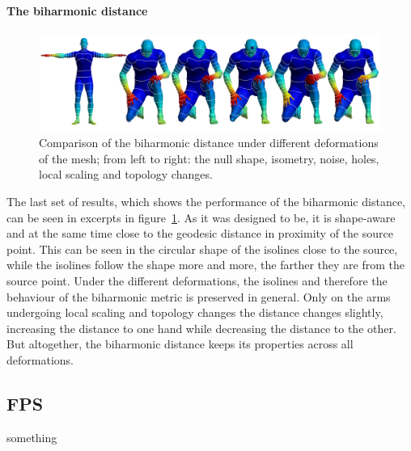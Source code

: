 \paragraph{The biharmonic distance}
\begin{figure}[h]
	\centering
	\includegraphics[width = \textwidth]{../results/biharmonic_isolines}
	\caption{Comparison of the biharmonic distance under different deformations of the mesh; from left to right: the null shape, isometry, noise, holes, local scaling and topology changes.}
	\label{fig:biharmonic_isolines}
\end{figure}
The last set of results, which shows the performance of the biharmonic distance, can be seen in excerpts in figure~\ref{fig:biharmonic_isolines}.
As it was designed to be, it is shape-aware and at the same time close to the geodesic distance in proximity of the source point.
This can be seen in the circular shape of the isolines close to the source, while the isolines follow the shape more and more, the farther they are from the source point.
Under the different deformations, the isolines and therefore the behaviour of the biharmonic metric is preserved in general.
Only on the arms undergoing  local scaling and topology changes the distance changes slightly, increasing the distance to one hand while decreasing the distance to the other.
But altogether, the biharmonic distance keeps its properties across all deformations.

\subsection{FPS}
something

